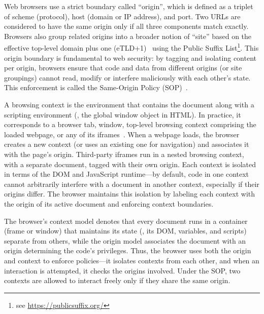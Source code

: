 %
Web browsers use a strict boundary called ``origin'', which is defined as a triplet of scheme (protocol), host (domain or IP address), and port. 
%
Two URLs are considered to have the same origin only if all three components match exactly. 
%
Browsers also group related origins into a broader notion of ``site'' based on the effective top-level domain plus one (eTLD+1)~\cite{TrackingPreventionWebKit2020} using the Public Suffix List\footnote{see \url{https://publicsuffix.org/}}.
%
This origin boundary is fundamental to web security: by tagging and isolating content per origin, browsers ensure that code and data from different origins (or site groupings) cannot read, modify or interfere maliciously with each other's state.
%
This enforcement is called the Same-Origin Policy (SOP)~\cite{mdnSameoriginPolicySecurity2024}.
%
%


%
A browsing context is the environment that contains the document along with a scripting environment (\eg{}, the global window object in HTML). 
%
In practice, it corresponds to a browser tab, window, top-level browsing context comprising the loaded webpage, or any of its iframes~\cite{MDNBrowsingContext}. 
%
When a webpage loads, the browser creates a new context (or uses an existing one for navigation) and associates it with the page’s origin. 
%
Third-party iframes run in a nested browsing context, with a separate document, tagged with their own origin.
%
Each context is isolated in terms of the DOM and JavaScript runtime---by default, code in one context cannot arbitrarily interfere with a document in another context, especially if their origins differ.
%
The browser maintains this isolation by labeling each context with the origin of its active document and enforcing context boundaries. 



%
The browser's context model denotes that every document runs in a container (frame or window) that maintains its state (\eg{}, its DOM, variables, and scripts) separate from others, while the origin model associates the document with an origin determining the code’s privileges.
%
Thus, the browser uses both the origin and context to enforce policies---it isolates contexts from each other, and when an interaction is attempted, it checks the origins involved. 
%
Under the SOP, two contexts are allowed to interact freely only if they share the same origin.
%




